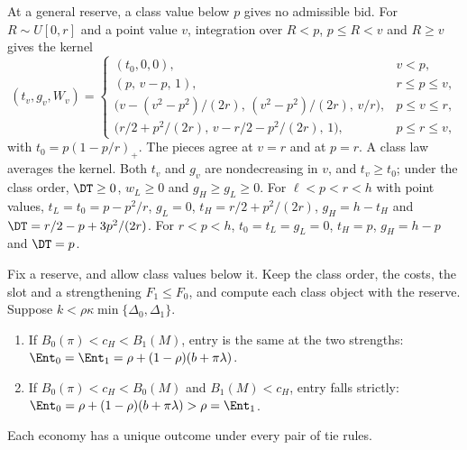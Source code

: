 At a general reserve, a class value below \(p\) gives no admissible bid. For \(R\sim U[0,r]\) and a point value \(v\),
integration over \(R<p\), \(p\le R<v\) and \(R\ge v\) gives the kernel
\begin{equation}\label{eq:a7-kernel}
(t_v,g_v,W_v)=
\begin{cases}
(t_0,0,0),&v<p,\\
(p,\,v-p,\,1),&r\le p\le v,\\
\bigl(v-(v^2-p^2)/(2r),\,(v^2-p^2)/(2r),\,v/r\bigr),&p\le v\le r,\\
\bigl(r/2+p^2/(2r),\,v-r/2-p^2/(2r),\,1\bigr),&p\le r\le v,
\end{cases}
\end{equation}
with \(t_0=p(1-p/r)_+\). The pieces agree at \(v=r\) and at \(p=r\). A class law averages the kernel. Both
\(t_v\) and \(g_v\) are nondecreasing in \(v\), and \(t_v\ge t_0\); under the class order, \(\DT\ge0\), \(w_L\ge0\) and
\(g_H\ge g_L\ge0\). For \(\ell<p<r<h\) with point values, \(t_L=t_0=p-p^2/r\), \(g_L=0\), \(t_H=r/2+p^2/(2r)\),
\(g_H=h-t_H\) and \(\DT=r/2-p+3p^2/(2r)\). For \(r<p<h\), \(t_0=t_L=g_L=0\), \(t_H=p\), \(g_H=h-p\) and \(\DT=p\).

\begin{proposition}\label{prop:reserves}
Fix a reserve, and allow class values below it. Keep the class order, the costs, the slot and a strengthening
\(F_1\le F_0\), and compute each class object with the reserve. Suppose \(k<\rho\kappa\min\{\Delta_0,\Delta_1\}\).
\begin{enumerate}[label=(\alph*),leftmargin=2em]
\item If \(B_0(\pi)<c_H<B_1(M)\), entry is the same at the two strengths:
\(\Ent_0=\Ent_1=\rho+(1-\rho)(b+\pi\lambda)\).
\item If \(B_0(\pi)<c_H<B_0(M)\) and \(B_1(M)<c_H\), entry falls strictly:
\(\Ent_0=\rho+(1-\rho)(b+\pi\lambda)>\rho=\Ent_1\).
\end{enumerate}
Each economy has a unique outcome under every pair of tie rules.
\end{proposition}

